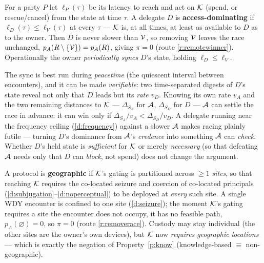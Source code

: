 \begin{definition}\label{def:dominating}
For a party $P$ let $\ell_P(\tau)$ be its latency to reach and act on $\mathcal{K}$ (spend,
or rescue/cancel) from the state at time $\tau$. A delegate $D$ is
\textbf{access-dominating} if $\ell_D(\tau) \le \ell_V(\tau)$ at every $\tau$ ---
$\mathcal{K}$ is, at all times, at least as available to $D$ as to the owner. Then $D$ is
never slower than $\mathcal{V}$, so removing $\mathcal{V}$ leaves the race unchanged,
$p_A(R\setminus\{\mathcal{V}\}) = p_A(R)$, giving $\pi = 0$ (route \ref{r:remotewinner}). Operationally
the owner \emph{periodically syncs} $D$'s state, holding $\ell_D \le \ell_V$.
\end{definition}

\begin{remark}\label{rem:verifiable-dominance}
The sync is best run during \emph{peacetime} (the quiescent interval between
encounters), and it can be made \emph{verifiable}: two time-separated digests of
$D$'s state reveal not only that $D$ leads but its \emph{rate} $v_D$. Knowing its
own rate $v_A$ and the two remaining distances to $\mathcal{K}$ --- $\Delta_{S_A}$ for
$\mathcal{A}$, $\Delta_{S_D}$ for $D$ --- $\mathcal{A}$ can settle the race in advance:
it can win only if $\Delta_{S_A}/v_A < \Delta_{S_D}/v_D$. A delegate running near the frequency
ceiling (\ref{d:frequency}) against a slower $\mathcal{A}$ makes racing plainly
futile --- turning $D$'s dominance from $\mathcal{A}$'s \emph{credence} into something
$\mathcal{A}$ can \emph{check}. Whether $D$'s held state is \emph{sufficient} for $\mathcal{K}$
or merely \emph{necessary} (so that defeating $\mathcal{A}$ needs only that $D$ can
\emph{block}, not spend) does not change the argument.
\end{remark}

\begin{definition}\label{def:geographic}
A protocol is \textbf{geographic} if $\mathcal{K}$'s gating is partitioned across $\ge 1$
\emph{sites}, so that reaching $\mathcal{K}$ requires the co-located seizure and coercion of
co-located principals (\ref{d:subjugation}--\ref{d:noperceptual}) to be deployed at
\emph{every} such site. A single WDY encounter is confined to one site
(\ref{d:seizure}); the moment $\mathcal{K}$'s gating requires a site the encounter does not
occupy, it has no feasible path, $p_A(\varnothing) = 0$, so $\pi = 0$ (route
\ref{r:removerace}). Custody may stay individual (the other sites are the owner's own devices),
but $\mathcal{K}$ now \emph{requires geographic locations} --- which is exactly the
negation of Property~\ref{p:know} (knowledge-based $\equiv$ non-geographic).
\end{definition}

